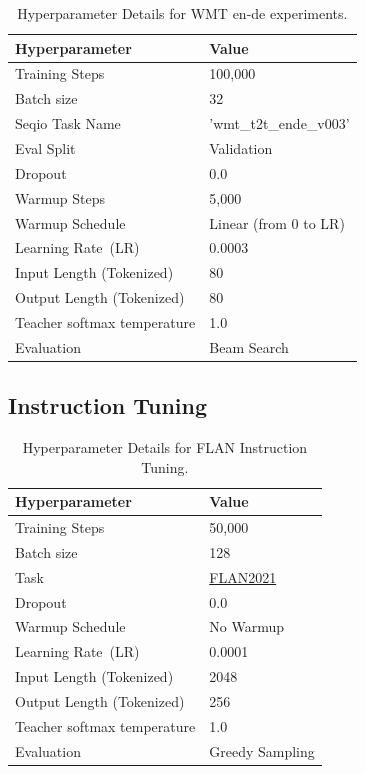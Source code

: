 \documentclass{article} %
\begin{document}
\begin{table}[h]
    \centering
    \caption{Hyperparameter Details for WMT en-de experiments.}
    \begin{tabularx}{0.65\textwidth}{lX}
        \toprule
        \textbf{Hyperparameter} & \textbf{Value} \\
        \midrule
        Training Steps & 100,000 \\
        Batch size & 32 \\
        Seqio Task Name & 'wmt\_t2t\_ende\_v003' \\
        Eval Split & Validation \\
        Dropout & 0.0 \\
        Warmup Steps & 5,000 \\
        Warmup Schedule & Linear (from 0 to LR)\\
        Learning Rate~(LR) & 0.0003 \\
        Input Length (Tokenized) & 80 \\
        Output Length (Tokenized) & 80 \\
        Teacher softmax temperature & 1.0 \\
        Evaluation & Beam Search \\
        \bottomrule
    \end{tabularx}
    \label{tab:hparams}
\end{table}





\subsection{Instruction Tuning}

\begin{table}[H]
    \centering
    \caption{Hyperparameter Details for FLAN Instruction Tuning.}
    \begin{tabularx}{0.65\textwidth}{lX}
        \toprule
        \textbf{Hyperparameter} & \textbf{Value} \\
        \midrule
        Training Steps & 50,000 \\
        Batch size & 128 \\
        Task & \href{https://huggingface.co/datasets/conceptofmind/flan2021_submix_original}{FLAN2021}  \\
        Dropout & 0.0 \\
        Warmup Schedule & No Warmup \\
        Learning Rate~(LR) & 0.0001 \\
        Input Length (Tokenized) & 2048 \\
        Output Length (Tokenized) & 256 \\
        Teacher softmax temperature & 1.0 \\
        Evaluation & Greedy Sampling \\
        \bottomrule
    \end{tabularx}
    \label{app:flan_hparams}
\end{table}
\end{document}
